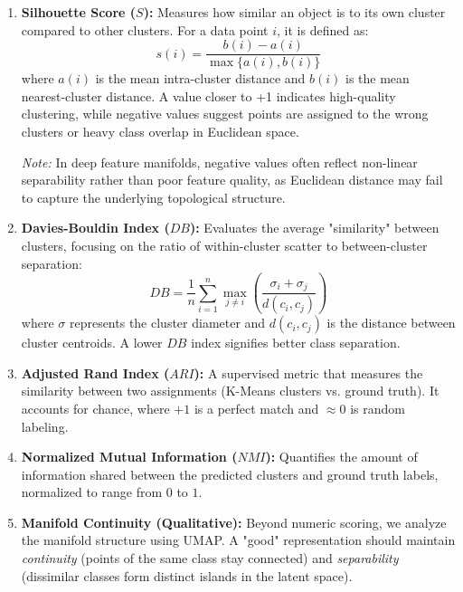 \begin{enumerate}
    \item \textbf{Silhouette Score ($S$):} Measures how similar an object is to its own cluster compared to other clusters. For a data point $i$, it is defined as:
    \begin{equation}
        s(i) = \frac{b(i) - a(i)}{\max\{a(i), b(i)\}}
    \end{equation}
    where $a(i)$ is the mean intra-cluster distance and $b(i)$ is the mean nearest-cluster distance. A value closer to +1 indicates high-quality clustering, while negative values suggest points are assigned to the wrong clusters or heavy class overlap in Euclidean space. 
    
    \textit{Note:} In deep feature manifolds, negative values often reflect non-linear separability rather than poor feature quality, as Euclidean distance may fail to capture the underlying topological structure.
    
    \item \textbf{Davies-Bouldin Index ($DB$):} Evaluates the average "similarity" between clusters, focusing on the ratio of within-cluster scatter to between-cluster separation:
    \begin{equation}
        DB = \frac{1}{n} \sum_{i=1}^n \max_{j \neq i} \left( \frac{\sigma_i + \sigma_j}{d(c_i, c_j)} \right)
    \end{equation}
    where $\sigma$ represents the cluster diameter and $d(c_i, c_j)$ is the distance between cluster centroids. A lower $DB$ index signifies better class separation.

    \item \textbf{Adjusted Rand Index ($ARI$):} A supervised metric that measures the similarity between two assignments (K-Means clusters vs. ground truth). It accounts for chance, where $+1$ is a perfect match and $\approx 0$ is random labeling.
    
    \item \textbf{Normalized Mutual Information ($NMI$):} Quantifies the amount of information shared between the predicted clusters and ground truth labels, normalized to range from $0$ to $1$.

    \item \textbf{Manifold Continuity (Qualitative):} Beyond numeric scoring, we analyze the manifold structure using UMAP. A "good" representation should maintain \textit{continuity} (points of the same class stay connected) and \textit{separability} (dissimilar classes form distinct islands in the latent space).
\end{enumerate}

